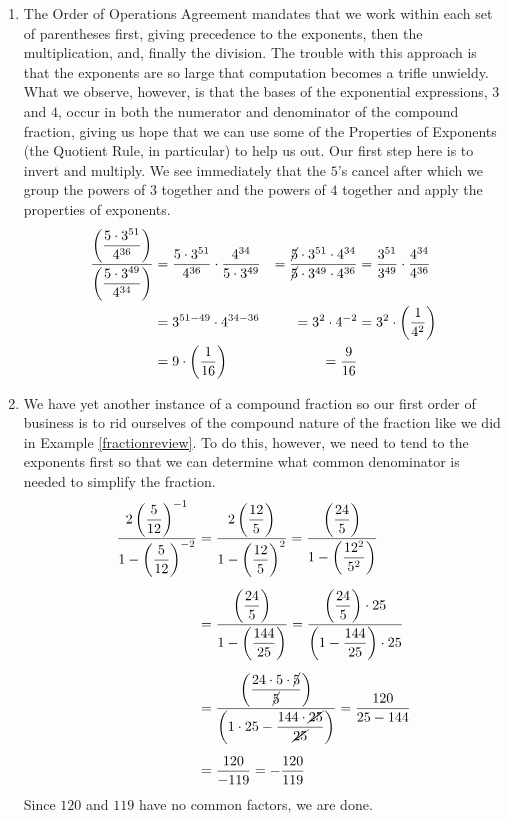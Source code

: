 {\begin{enumerate}
\item  The Order of Operations Agreement mandates that we work within each set of parentheses first, giving precedence to the exponents, then the multiplication, and, finally the division.  The trouble with this approach is that the exponents are so large that computation becomes a trifle unwieldy.   What we observe, however, is that the bases of the exponential expressions, $3$ and $4$, occur in both the numerator and denominator of the compound fraction, giving us hope that we can use some of the Properties of Exponents (the Quotient Rule, in particular) to help us out. Our first step here is to invert and multiply.  We see immediately that the $5$'s cancel after which we group the powers of $3$ together and the powers of $4$ together and apply the properties of exponents.
\begin{align*}
\dfrac{\left(\dfrac{5\cdot 3^{51}}{4^{36}}\right)}{\left(\dfrac{5 \cdot 3^{49}}{4^{34}}\right)} & =  \dfrac{5\cdot 3^{51}}{4^{36}} \cdot \dfrac{4^{34}}{5 \cdot 3^{49}} & =  \dfrac{\cancel{5} \cdot 3^{51} \cdot 4^{34}}{\cancel{5} \cdot 3^{49} \cdot 4^{36}} & =  \dfrac{3^{51}}{3^{49}} \cdot\dfrac{4^{34}}{4^{36}} \\
& =  3^{51-49} \cdot 4^{34-36} & =  3^{2} \cdot 4^{-2} & =  3^{2} \cdot \left( \dfrac{1}{4^2}\right) \\
& =  9 \cdot \left(\dfrac{1}{16} \right) & =  \dfrac{9}{16} &  
\end{align*}

\item We have yet another instance of a compound fraction so our first order of business is to rid ourselves of the compound nature of the fraction like we did in Example \ref{fractionreview}.  To do this, however, we need to tend to the exponents first so that we can determine what common denominator is needed to simplify the fraction.
\begin{align*}
\dfrac{2 \left(\dfrac{5}{12}\right)^{-1}}{1 - \left(\dfrac{5}{12}\right)^{-2}} & =  \dfrac{2 \left(\dfrac{12}{5}\right)}{1 - \left(\dfrac{12}{5}\right)^{2}} =  \dfrac{\left(\dfrac{24}{5}\right)}{1 - \left(\dfrac{12^2}{5^2}\right)}\\[5pt]
 & =  \dfrac{\left(\dfrac{24}{5}\right)}{1 - \left(\dfrac{144}{25}\right)}  =  \dfrac{\left(\dfrac{24}{5}\right) \cdot 25}{\left(1 - \dfrac{144}{25}\right)\cdot 25}\\[5pt]
  & =  \dfrac{\left(\dfrac{24\cdot 5 \cdot \cancel{5}}{\cancel{5}}\right)}{\left(1 \cdot 25 - \dfrac{144 \cdot \cancel{25}}{\cancel{25}}\right)}  =  \dfrac{120}{25-144} \\[5pt]
& =  \dfrac{120}{-119} = -\dfrac{120}{119}
\end{align*}
Since $120$ and $119$ have no common factors, we are done. 

\end{enumerate}
}

